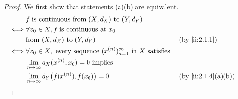 \begin{proof}
  We first show that statements (a)(b) are equivalent.
  \begin{align*}
         & f \text{ is continuous from } (X, d_X) \text{ to } (Y, d_Y)                                                                  \\
    \iff & \forall x_0 \in X, f \text{ is continuous at } x_0                                                                           \\
         & \text{from } (X, d_X) \text{ to } (Y, d_Y)                                                           &  & \by{ii:2.1.1}      \\
    \iff & \forall x_0 \in X, \text{ every sequence } (x^{(n)})_{n = 1}^\infty \text{ in } X \text{ satisfies }                         \\
         & \lim_{n \to \infty} d_X(x^{(n)}, x_0) = 0 \text{ implies}                                                                    \\
         & \lim_{n \to \infty} d_Y\big(f(x^{(n)}), f(x_0)\big) = 0.                                             &  & \by{ii:2.1.4}[a,b]
  \end{align*}


\end{proof}
